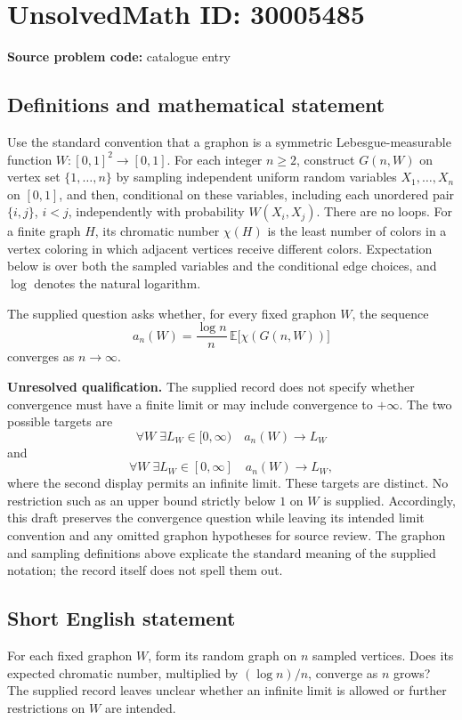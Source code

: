 \documentclass[11pt]{article}
\begin{document}
\section*{UnsolvedMath ID: 30005485}
\textbf{Source problem code:} catalogue entry
\subsection{Definitions and mathematical statement}
Use the standard convention that a graphon is a symmetric Lebesgue-measurable function \(W\colon[0,1]^2\to[0,1]\). For each integer \(n\geq 2\), construct \(G(n,W)\) on vertex set \(\{1,\ldots,n\}\) by sampling independent uniform random variables \(X_1,\ldots,X_n\) on \([0,1]\), and then, conditional on these variables, including each unordered pair \(\{i,j\}\), \(i<j\), independently with probability \(W(X_i,X_j)\). There are no loops. For a finite graph \(H\), its chromatic number \(\chi(H)\) is the least number of colors in a vertex coloring in which adjacent vertices receive different colors. Expectation below is over both the sampled variables and the conditional edge choices, and \(\log\) denotes the natural logarithm.

The supplied question asks whether, for every fixed graphon \(W\), the sequence
\[
 a_n(W)=\frac{\log n}{n}\,\mathbb{E}\bigl[\chi(G(n,W))\bigr]
\]
converges as \(n\to\infty\).

\textbf{Unresolved qualification.} The supplied record does not specify whether convergence must have a finite limit or may include convergence to \(+\infty\). The two possible targets are
\[
 \forall W\;\exists L_W\in[0,\infty)\quad a_n(W)\longrightarrow L_W
\]
and
\[
 \forall W\;\exists L_W\in[0,\infty]\quad a_n(W)\longrightarrow L_W,
\]
where the second display permits an infinite limit. These targets are distinct. No restriction such as an upper bound strictly below \(1\) on \(W\) is supplied. Accordingly, this draft preserves the convergence question while leaving its intended limit convention and any omitted graphon hypotheses for source review. The graphon and sampling definitions above explicate the standard meaning of the supplied notation; the record itself does not spell them out.
\subsection{Short English statement}
For each fixed graphon \(W\), form its random graph on \(n\) sampled vertices. Does its expected chromatic number, multiplied by \((\log n)/n\), converge as \(n\) grows? The supplied record leaves unclear whether an infinite limit is allowed or further restrictions on \(W\) are intended.
\end{document}
